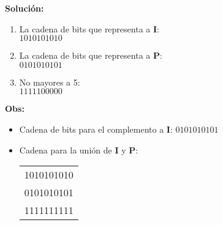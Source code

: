 \textbf{Solución: }
\begin{enumerate}
\item La cadena de bits que representa a \textbf{I}:\\
	$1010101010$
\item La cadena de bits que representa a \textbf{P}:\\
	$0101010101$
\item No mayores a 5:\\
	$1111100000$
\end{enumerate}
\textbf{Obs:} 
\begin{itemize}
\item Cadena de bits para el complemento a \textbf{I}: $0101010101$
\item Cadena para la unión de \textbf{I} y \textbf{P}:
\begin{center}
\begin{tabular}{c}
1010101010\\
0101010101\\ \hline
1111111111
\end{tabular}
\end{center}
\end{itemize} 

					


